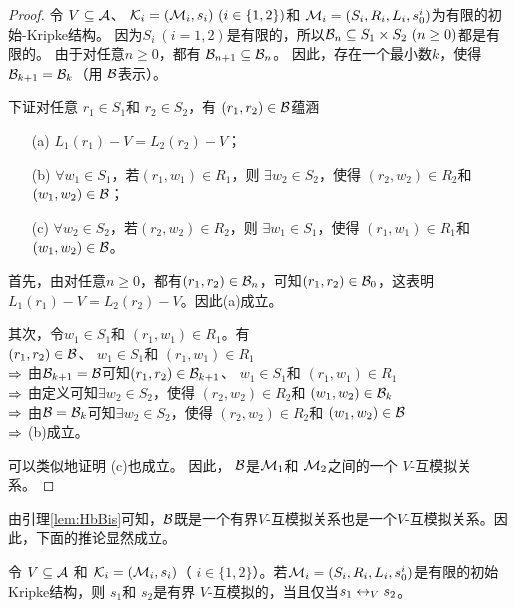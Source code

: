 \begin{proof}
	令 $V \subseteq {\cal A}$、 ${\cal K}_i=({\cal M}_i,s_i)~(i\in\{1,2\})$和 ${\cal M}_i=(S_i, R_i,L_i, s_0^i)$为有限的初始-Kripke结构。
	因为$S_i~(i=1,2)$是有限的，所以${\cal B}_n\subseteq S_1\times S_2~(n\ge 0)$都是有限的。
	由于对任意$n\geq 0$，都有 ${\cal B}_{n+1} \subseteq {\cal B}_n$。
	因此，存在一个最小数$k$，使得
	${\cal B}_{k+1} ={\cal B}_k$（用 ${\cal B}$表示）。
	
	
	下证对任意 $r_1\in S_1$和 $r_2 \in S_2$，有 $(r_1, r_2)\in {\cal B}$蕴涵 %
	\begin{itemize}
		\item[(a)] $L_1(r_1)-V = L_2(r_2)-V$；
		\item[(b)] $\forall w_1\in S_1$，若$(r_1, w_1)\in R_1$，则 $\exists w_2 \in S_2$，使得 $(r_2,w_2) \in R_2$和 $(w_1, w_2) \in {\cal B}$；
		\item[(c)] $\forall w_2\in S_2$，若$(r_2, w_2)\in R_2$，则 $\exists w_1 \in S_1$，使得 $(r_1,w_1) \in R_1$和 $(w_1, w_2)\in {\cal B} $。
	\end{itemize}
	
	首先，由对任意$n\ge 0$，都有$(r_1, r_2)\in {\cal B}_n$，可知$(r_1, r_2) \in {\cal B}_0$，这表明
	$L_1(r_1)-V = L_2(r_2)-V$。因此(a)成立。
	
	其次，令$w_1 \in S_1$和 $(r_1, w_1)\in R_1$。有 \\
	$(r_1,r_2)\in {\cal B}$、 $w_1 \in S_1$和 $(r_1, w_1)\in R_1$\\
	$\Rightarrow$ 由${\cal B}_{k+1}={\cal B}$可知$(r_1,r_2)\in {\cal B}_{k+1}$、 $w_1 \in S_1$和 $(r_1, w_1)\in R_1$\\
	$\Rightarrow$ 由定义可知$\exists w_2\in S_2$，使得 $(r_2, w_2)\in R_2$和 $(w_1,w_2)\in {\cal B}_k$\\
	$\Rightarrow$ 由${\cal B}={\cal B}_k$可知$\exists w_2\in S_2$，使得 $(r_2, w_2)\in R_2$和 $(w_1,w_2)\in {\cal B}$\\
	$\Rightarrow$ (b)成立。
	
	可以类似地证明 (c)也成立。
	因此， ${\cal B}$是${\cal M}_1$和 ${\cal M}_2$之间的一个 $V$-互模拟关系。
\end{proof}

由引理\ref{lem:HbBis}可知，${\cal B}$既是一个有界$V$-互模拟关系也是一个$V$-互模拟关系。因此，下面的推论显然成立。
\begin{corollary} \label{lem:bounedToGe}
	令 $V \subseteq {\cal A}$ 和 ${\cal K}_i=({\cal M}_i,s_i)$（ $i\in\{1,2\}$）。若${\cal M}_i=(S_i, R_i,L_i, s_0^i)$是有限的初始Kripke结构，则
	$s_1$和 $s_2$是有界 $V$-互模拟的，当且仅当$s_1 \leftrightarrow_V s_2$。
\end{corollary}


